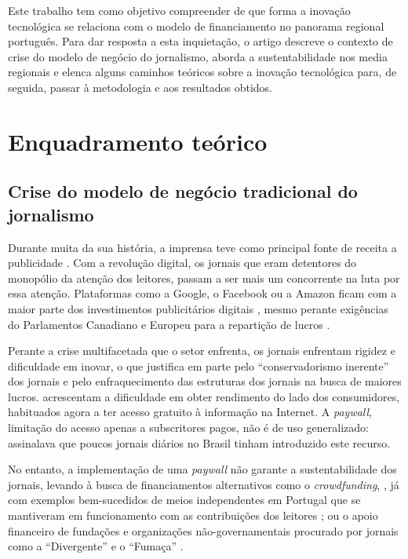 \documentclass[portuguese]{textolivre}
\begin{document}
Este trabalho tem como objetivo compreender de que forma a inovação
tecnológica se relaciona com o modelo de financiamento no panorama
regional português. Para dar resposta a esta inquietação, o artigo
descreve o contexto de crise do modelo de negócio do jornalismo, aborda
a sustentabilidade nos media regionais e elenca alguns caminhos teóricos
sobre a inovação tecnológica para, de seguida, passar à metodologia e
aos resultados obtidos.

\section{Enquadramento teórico}
\subsection{Crise do modelo de negócio tradicional do jornalismo}

Durante muita da sua história, a imprensa teve como principal fonte de
receita a publicidade \cite{Ohlsson2017}. Com a revolução digital, os
jornais que eram detentores do monopólio da atenção dos leitores, passam
a ser mais um concorrente na luta por essa atenção. Plataformas como a
Google, o Facebook ou a Amazon ficam com a maior parte dos investimentos
publicitários digitais \cite{Breiner2016}, mesmo perante exigências do
Parlamentos Canadiano e Europeu para a repartição de lucros
\cite{Chan2023}.

Perante a crise multifacetada que o setor enfrenta, os jornais enfrentam
rigidez e dificuldade em inovar, o que \textcite{Meyer2009} justifica em parte
pelo ``conservadorismo inerente'' dos jornais e pelo enfraquecimento das
estruturas dos jornais na busca de maiores lucros. \textcite{IhlstromEriksson2016} acrescentam a dificuldade em obter rendimento do lado dos
consumidores, habituados agora a ter acesso gratuito à informação na
Internet. A \emph{paywall}, limitação do acesso apenas a subscritores
pagos, não é de uso generalizado: \textcite{Reis2019} assinalava que poucos
jornais diários no Brasil tinham introduzido este recurso.

No entanto, a implementação de uma \emph{paywall} não garante a
sustentabilidade dos jornais, levando à busca de financiamentos
alternativos como o \emph{crowdfunding}, \cite{Fonseca2016}, já com exemplos bem-sucedidos de meios independentes em Portugal
que se mantiveram em funcionamento com as contribuições dos leitores
\cite{Teixeira2021}; ou o apoio financeiro de fundações e organizações
não-governamentais procurado por jornais como a ``Divergente'' e o
``Fumaça'' \cite{Chaves2021,Bonixe2022}.
\end{document}
